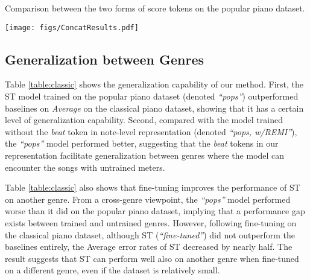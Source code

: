 \documentclass[sigconf]{acmart} %
\begin{document}
\begin{table}[h]
 \caption{Comparison between the two forms of score tokens on the popular piano dataset.}
 \label{table:concat}
  \centering
  \footnotesize
  \renewcommand{\arraystretch}{1.15}
 \texttt{[image: figs/ConcatResults.pdf]}
\end{table}


\subsection{Generalization between Genres}
Table \ref{table:classic} shows the generalization capability of our method. First, the ST model trained on the popular piano dataset (denoted \textit{“pops”}) outperformed baselines on \textit{Average} on the classical piano dataset, showing that it has a certain level of generalization capability. Second, compared with the model trained without the \textit{beat} token in note-level representation (denoted \textit{“pops, w/REMI”}), the \textit{“pops”} model performed better, suggesting that the \textit{beat} tokens in our representation facilitate generalization between genres where the model can encounter the songs with untrained meters.

Table \ref{table:classic} also shows that fine-tuning improves the performance of ST on another genre. From a cross-genre viewpoint, the \textit{“pops”} model performed worse than it did on the popular piano dataset, implying that a performance gap exists between trained and untrained genres. However, following fine-tuning on the classical piano dataset, although ST (\textit{“fine-tuned”}) did not outperform the baselines entirely, the Average error rates of ST decreased by nearly half. The result suggests that ST can perform well also on another genre when fine-tuned on a different genre, even if the dataset is relatively small. 
\end{document}
